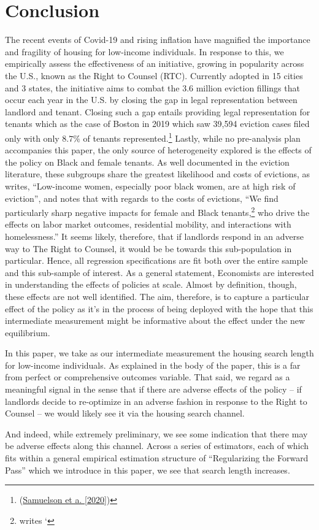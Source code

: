 \documentclass[a4paper,12pt]{article}
\begin{document}
\section{Conclusion}
The recent events of Covid-19 and rising inflation have magnified the importance and fragility of housing for low-income individuals. In response to this, we empirically assess the effectiveness of an initiative, growing in popularity across the U.S., known as the Right to Counsel (RTC). Currently adopted in 15 cities and 3 states, the initiative aims to combat the 3.6 million eviction fillings that occur each year in the U.S. by closing the gap in legal representation between landlord and tenant. Closing such a gap entails providing legal representation for tenants which as the case of Boston in 2019 which saw 39,594 eviction cases filed only  with only $8.7\%$ of tenants represented.\footnote{(\href{https://bostonbar.org/app/uploads/2022/06/rtc-report-for-web-or-email.pdf}{Samuelson et a. [2020]})}
Lastly, while no pre-analysis plan accompanies this paper, the only source of heterogeneity explored is the effects of the policy on Black and female tenants. As well documented in the eviction literature, these subgroups share the greatest likelihood and costs of evictions, as \cite{desmond2019unaffordable} writes, ``Low-income women, especially poor black women, are at high risk of eviction'', and \cite{collinson2022eviction} notes that with regards to the costs of evictions, ``We find particularly sharp negative impacts for female and Black tenants,\footnote{\cite{evans2019reducing} writes `} who drive the effects on labor market outcomes, residential mobility, and interactions with homelessness.'' It seems likely, therefore, that if landlords respond in an adverse way to The Right to Counsel, it would be be towards this sub-population in particular. Hence, all regression specifications are fit both over the entire sample and this sub-sample of interest. 
As a general statement, Economists are interested in understanding the effects of policies at scale. Almost by definition, though, these effects are not well identified. The aim, therefore, is to capture a particular effect of the policy as it's in the process of being deployed with the hope that this intermediate measurement might be informative about the effect under the new equilibrium.\par 
In this paper, we take as our intermediate measurement the housing search length for low-income individuals. As explained in the body of the paper, this is a far from perfect or comprehensive outcomes variable. That said, we regard as a meaningful signal in the sense that if there are adverse effects of the policy -- if landlords decide to re-optimize in an adverse fashion in response to the Right to Counsel -- we would likely see it via the housing search channel. \par 
And indeed, while extremely preliminary, we see some indication that there may be adverse effects along this channel. Across a series of estimators, each of which fits within a general empirical estimation structure of ``Regularizing the Forward Pass'' which we introduce in this paper, we see that search length increases.
\end{document}
